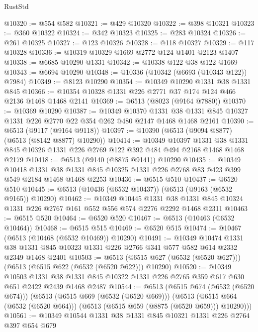 \begin{lexlean}{RustStd}
\begin{coremodule}
@10320 := @554 @582
@10321 := @429 @10320
@10322 := @398 @10321
@10323 := @360 @10322
@10324 := @342 @10323
@10325 := @283 @10324
@10326 := @261 @10325
@10327 := @123 @10326
@10328 := @118 @10327
@10329 := @117 @10328
@10336 := @10319 @10329 @1669 @2772 @124 @1401 @2123 @1407
@10338 := @6685 @10290 @1331
@10342 := @10338 @122 @38 @122 @1669
@10343 := @6694 @10290
@10348 := @10336 (@10342 (@6693 (@10343 @122)) @7984)
@10349 := @8123 @10290
@10354 := @10349 @10290 @1331 @38 @1331 @845
@10366 := @10354 @10328 @1331 @226 @2771 @37 @174 @124 @466 @2136 @1468 @1468 @2141
@10369 := @6513 (@8023 (@9164 @7880))
@10370 := @10369 @10290
@10387 := @10349
    @10370
    @1331
    @38
    @1331
    @845
    @10327
    @1331
    @226
    @2770
    @22
    @354
    @262
    @480
    @2147
    @1468
    @1468
    @2161
@10390 := @6513 (@9117 (@9164 @9118))
@10397 := @10390 (@6513 (@9094 @8877) (@6513 (@8142 @8877) @10290))
@10414 := @10349
    @10397
    @1331
    @38
    @1331
    @845
    @10326
    @1331
    @226
    @2769
    @122
    @392
    @484
    @494
    @2168
    @1468
    @1468
    @2179
@10418 := @6513 (@9140 (@8875 @9141)) @10290
@10435 := @10349
    @10418
    @1331
    @38
    @1331
    @845
    @10325
    @1331
    @226
    @2768
    @83
    @423
    @399
    @549
    @2184
    @1468
    @1468
    @2253
@10436 := @6515 @510
@10437 := @6520 @510
@10445 := @6513 (@10436 (@6532 @10437)) (@6513 (@9163 (@6532 @9165)) @10290)
@10462 := @10349
    @10445
    @1331
    @38
    @1331
    @845
    @10324
    @1331
    @226
    @2767
    @161
    @552
    @556
    @574
    @2276
    @2292
    @1468
    @2311
@10463 := @6515 @520
@10464 := @6520 @520
@10467 := @6513 (@10463 (@6532 @10464))
@10468 := @6515 @515
@10469 := @6520 @515
@10474 := @10467 (@6513 (@10468 (@6532 @10469)) @10290)
@10491 := @10349
    @10474
    @1331
    @38
    @1331
    @845
    @10323
    @1331
    @226
    @2766
    @341
    @577
    @582
    @614
    @2332
    @2349
    @1468
    @2401
@10503 := @6513 (@6515 @627 (@6532 (@6520 @627))) (@6513 (@6515 @622 (@6532 (@6520 @622))) @10290)
@10520 := @10349
    @10503
    @1331
    @38
    @1331
    @845
    @10322
    @1331
    @226
    @2765
    @359
    @617
    @630
    @651
    @2422
    @2439
    @1468
    @2487
@10544 := @6513
    (@6515 @674 (@6532 (@6520 @674)))
    (@6513
      (@6515 @669 (@6532 (@6520 @669)))
      (@6513 (@6515 @664 (@6532 (@6520 @664))) (@6513 (@6515 @659 (@8875 (@6520 @659))) @10290)))
@10561 := @10349
    @10544
    @1331
    @38
    @1331
    @845
    @10321
    @1331
    @226
    @2764
    @397
    @654
    @679

\end{coremodule}
\end{lexlean}
